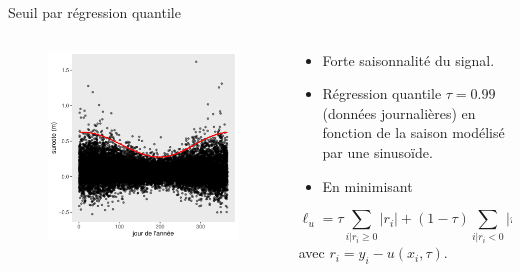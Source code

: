 \documentclass[aspectratio=169]{beamer}
\begin{document}
\begin{frame}{Seuil par régression quantile}
\begin{columns}
	\begin{column}{0.4\textwidth}
		\begin{figure}
		\vspace{-0.4cm}
	 		\includegraphics[height=0.875\textheight, center]{../figures/points.pdf}
		\end{figure}
	\end{column}
	\begin{column}{0.6\textwidth}
	\begin{itemize}
	\setlength{\itemsep}{10pt}
	\item Forte saisonnalité du signal.
	\item Régression quantile $\tau = 0.99$ (données journalières) en fonction de la saison modélisé par une sinusoïde.
	\item En minimisant
	\end{itemize}
	\begin{equation*}
	\ell_u = \tau \sum_{i|r_i \geq 0} |r_i| + (1-\tau) \sum_{i|r_i < 0} |r_i|
	\end{equation*}
	\phantom{-----.} avec $r_i = y_i - u(x_i,\tau)$.
	\end{column}
\end{columns}
\end{frame}
\end{document}
